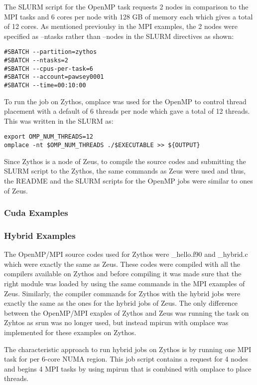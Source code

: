 \documentclass[journal]{IEEEtran}
\begin{document}
{The SLURM script for the OpenMP task requests 2 nodes in comparison to the MPI tasks and 6 cores per node with 128 GB of memory each which gives a total 
of 12 cores. As mentioned previoulsy in the MPI examples, the 2 nodes were specified as --ntasks rather than --nodes in the SLURM directives as shown:

\begin{verbatim}
#SBATCH --partition=zythos
#SBATCH --ntasks=2
#SBATCH --cpus-per-task=6
#SBATCH --account=pawsey0001
#SBATCH --time=00:10:00
\end{verbatim}

To run the job on Zythos, omplace was used for the OpenMP to control thread placement with a default of 6 threads per node which gave a total of 12 
threads. This was written in the SLURM as:

\begin{verbatim}
export OMP_NUM_THREADS=12
omplace -nt $OMP_NUM_THREADS ./$EXECUTABLE >> ${OUTPUT}
\end{verbatim}

Since Zythos is a node of Zeus, to compile the source codes and submitting the SLURM script to the Zythos, the same commands as Zeus were used and thus,
the README and the SLURM scripts for the OpenMP jobs were similar to ones of Zeus.

\subsubsection{Cuda Examples}


\subsubsection{Hybrid Examples}

The OpenMP/MPI source codes used for Zythos were \hybrid\_hello.f90 and \hello\_hybrid.c which were exactly the same as Zeus. These codes were compiled with
all the compilers available on Zythos and before compiling it was made sure that the right module was loaded by using the same commands in the MPI 
examples of Zeus. Similarly, the compiler commands for Zythos with the hybrid jobs were exactly the same as the ones for the hybrid jobs of Zeus. The
only difference between the OpenMP/MPI exaples of Zythos and Zeus was running the task on Zyhtos as srun was no longer used, but instead mpirun with 
omplace was implemented for these examples on Zythos. 

The characteristic approach to run hybrid jobs on Zythos is by running one MPI task for per 6-core NUMA region. This job script contains a request for 4
nodes and begins 4 MPI tasks by using mpirun that is combined with omplace to place threads.

}
\end{document}
